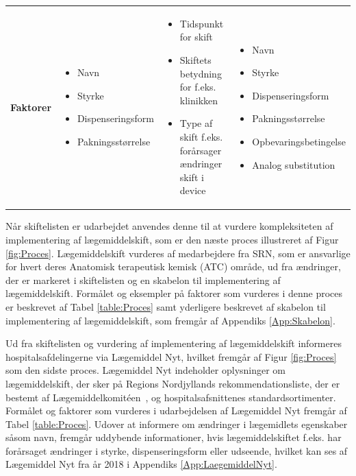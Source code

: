 \begin{table}[H]
\begin{tabular}{p{1.8cm}|p{3.5cm}|p{3.5cm}|p{4.2cm}}
\cellcolor[HTML]{C0C0C0}\textbf{Faktorer} & \vspace{-0.2cm}\begin{itemize}[topsep=-0.5cm,leftmargin=0.3cm] \item Navn \item Styrke\item Dispenseringsform \item Pakningsstørrelse \end{itemize} & \vspace{-0.2cm}\begin{itemize}[topsep=-0.5cm,leftmargin=0.3cm] \item Tidspunkt for skift\item Skiftets betydning for f.eks. klinikken \item Type af skift f.eks. forårsager ændringer skift i device \end{itemize}  & \vspace{-0.2cm}\begin{itemize}[topsep=-0.5cm,leftmargin=0.3cm] \item Navn \item Styrke \item Dispenseringsform \item Pakningsstørrelse \item Opbevaringsbetingelse \item Analog substitution  \end{itemize}    
\end{tabular}
\end{table}

Når skiftelisten er udarbejdet anvendes denne til at vurdere kompleksiteten af implementering af lægemiddelskift, som er den næste proces illustreret af Figur \ref{fig:Proces}. Lægemiddelskift vurderes af medarbejdere fra SRN, som er ansvarlige for hvert deres Anatomisk terapeutisk kemisk (ATC) område, ud fra ændringer, der er markeret i skiftelisten og en skabelon til implementering af lægemiddelskift. Formålet og eksempler på faktorer som vurderes i denne proces er beskrevet af Tabel \ref{table:Proces} samt yderligere beskrevet af skabelon til implementering af lægemiddelskift, som fremgår af Appendiks \ref{App:Skabelon}.

Ud fra skiftelisten og vurdering af implementering af lægemiddelskift informeres hospitalsafdelingerne via Lægemiddel Nyt, hvilket fremgår af Figur \ref{fig:Proces} som den sidste proces. Lægemiddel Nyt indeholder oplysninger om lægemiddelskift, der sker på Regions Nordjyllands rekommendationsliste, der er bestemt af Lægemiddelkomitéen~\citep{RegionNordjylland2018}, og hospitalsafsnittenes standardsortimenter. Formålet og faktorer som vurderes i udarbejdelsen af Lægemiddel Nyt fremgår af Tabel \ref{table:Proces}. Udover at informere om ændringer i lægemidlets egenskaber såsom navn, fremgår uddybende informationer, hvis lægemiddelskiftet f.eks. har forårsaget ændringer i styrke, dispenseringsform eller udseende, hvilket kan ses af Lægemiddel Nyt fra år 2018 i Appendiks \ref{App:LaegemiddelNyt}.


